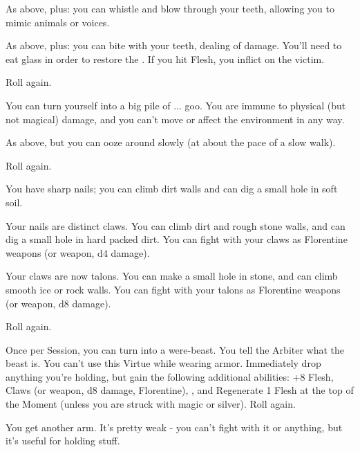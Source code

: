 \begin{multicols*}{2}
  As above, plus:  you can whistle and blow through your teeth, allowing you to mimic animals or voices.

  As above, plus:  you can bite with your teeth, dealing  of damage.  You'll need to eat glass in order to restore the \UD.  If you hit Flesh, you inflict  on the victim.

  Roll again.


\NC[Name=Goo]

  You can turn yourself into a big pile of ... goo.  You are immune to physical (but not magical) damage, and you can't move or affect the environment in any way.

  As above, but you can ooze around slowly (at about the pace of a slow walk).

  Roll again.

\NC[Name=Harpy Claws]

  You have sharp nails; you can climb dirt walls and can dig a small hole in soft soil.

  Your nails are distinct claws.  You can climb dirt and rough stone walls, and can dig a small hole in hard packed dirt. You can fight with your claws as Florentine weapons (\VIG or \DEX weapon, d4 damage).

  Your claws are now talons.  You can make a small hole in stone, and can climb smooth ice or rock walls.  You can fight with your talons as Florentine weapons (\VIG or \DEX weapon, d8 damage).

  Roll again.

\cbreak

\NC[Name=Lie Can]

  Once per Session, you can turn into a were-beast.  You tell the Arbiter what the beast is.  You can't use this Virtue while wearing armor.  Immediately drop anything you're holding, but gain the following additional abilities:  +8 Flesh, Claws (\VIG or \DEX weapon, d8 damage, Florentine), , and Regenerate 1 Flesh at the top of the Moment (unless you are struck with magic or silver).  
 Roll again.


\NC[Name='nother Arm]

  You get another arm.  It's pretty weak - you can't fight with it or anything, but it's useful for holding stuff.


\end{multicols*}
